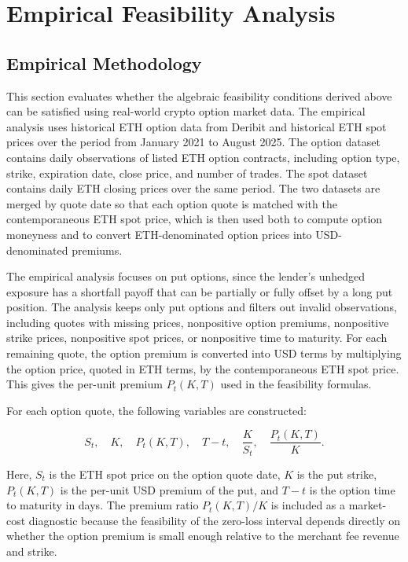 \documentclass[11pt]{article}
\begin{document}
\section{Empirical Feasibility Analysis}

\subsection{Empirical Methodology}

This section evaluates whether the algebraic feasibility conditions derived above can be satisfied using real-world crypto option market data. The empirical analysis uses historical ETH option data from Deribit and historical ETH spot prices over the period from January 2021 to August 2025. The option dataset contains daily observations of listed ETH option contracts, including option type, strike, expiration date, close price, and number of trades. The spot dataset contains daily ETH closing prices over the same period. The two datasets are merged by quote date so that each option quote is matched with the contemporaneous ETH spot price, which is then used both to compute option moneyness and to convert ETH-denominated option prices into USD-denominated premiums.

The empirical analysis focuses on put options, since the lender’s unhedged exposure has a shortfall payoff that can be partially or fully offset by a long put position. The analysis keeps only put options and filters out invalid observations, including quotes with missing prices, nonpositive option premiums, nonpositive strike prices, nonpositive spot prices, or nonpositive time to maturity. For each remaining quote, the option premium is converted into USD terms by multiplying the option price, quoted in ETH terms, by the contemporaneous ETH spot price. This gives the per-unit premium $P_t(K,T)$ used in the feasibility formulas.

For each option quote, the following variables are constructed:

$$
S_t,\quad
K,\quad
P_t(K,T),\quad
T-t,\quad
\frac{K}{S_t},\quad
\frac{P_t(K,T)}{K}.
$$

Here, $S_t$ is the ETH spot price on the option quote date, $K$ is the put strike, $P_t(K,T)$ is the per-unit USD premium of the put, and $T-t$ is the option time to maturity in days. The premium ratio $P_t(K,T)/K$ is included as a market-cost diagnostic because the feasibility of the zero-loss interval depends directly on whether the option premium is small enough relative to the merchant fee revenue and strike.
\end{document}
